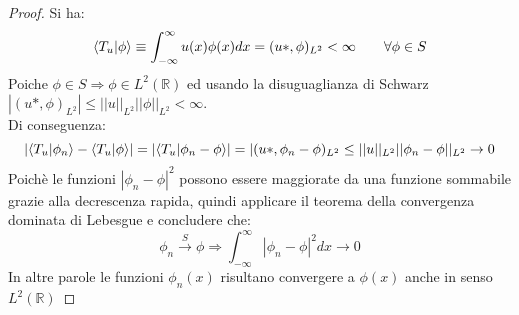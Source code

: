 \documentclass[twoside]{article}
\begin{document}
\begin{proof}
Si ha:
\begin{equation}
        \bra{T_u}\ket{\phi}\equiv\int_{-\infty}^\infty u(x)\phi(x)dx=(u*,\phi)_{L^2}<\infty \qquad \forall \phi\in S
\end{equation}
Poiche $\phi\in S\Longrightarrow\phi \in L^2(\mathds{R})$ ed usando la disuguaglianza di Schwarz $|(u*,\phi)_{L^2}|\le||u||_{L^2}||\phi||_{L^2}<\infty$.\\
Di conseguenza:
\begin{equation}
    \left|\bra{T_u}\ket{\phi_n}-\bra{T_u}\ket{\phi}\right|=\left|\bra{T_u}\ket{\phi_n-\phi}\right|=|(u*,\phi_n-\phi)_{L^2}\le||u||_{L^2}||\phi_n-\phi||_{L^2}\to 0
\end{equation}
Poichè le funzioni $|\phi_n-\phi|^2$ possono essere maggiorate da una funzione sommabile grazie alla decrescenza rapida, quindi applicare il teorema della convergenza dominata di Lebesgue e concludere che:
\begin{equation}
    \phi_n\xrightarrow{S} \phi \Longrightarrow\int_{-\infty}^\infty|\phi_n-\phi|^2dx\to 0
\end{equation}
In altre parole le funzioni $\phi_n(x)$ risultano convergere a $\phi(x)$ anche in senso $L^2(\mathds{R})$
\end{proof}

\newpage
\end{document}
